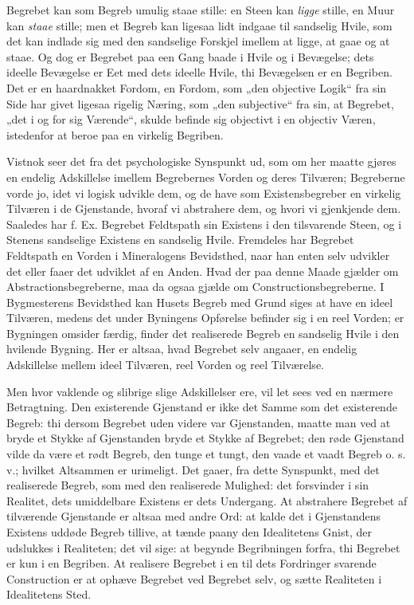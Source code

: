 \documentclass[11pt]{book}
\newcommand{\opage}[1]{\marginnote{\footnotesize\textit{[#1]}}}
\begin{document}
Begrebet kan som Begreb umulig staae stille: en Steen kan
\emph{ligge} stille, en Muur kan \emph{staae} stille; men et Begreb
kan ligesaa lidt indgaae til sandselig Hvile, som det kan indlade sig
med den sandselige Forskjel imellem at ligge, at gaae og at staae. Og
dog er Begrebet paa een Gang baade i Hvile og i Bevægelse; dets
ideelle Bevægelse er Eet med dets ideelle Hvile, thi Bevægelsen er en
Begriben. Det er en haardnakket Fordom, en Fordom, som „den objective
Logik“ fra sin Side har givet ligesaa rigelig Næring, som „den
subjective“ fra sin, at Begrebet, „det i og for sig Værende“, skulde
befinde sig objectivt i en objectiv Væren, istedenfor at beroe paa en
virkelig Begriben.

Vistnok seer det fra det psychologiske Synspunkt ud, som om her maatte
gjøres en endelig Adskillelse imellem Begrebernes Vorden og deres
Tilværen; Begreberne vorde jo, idet vi logisk udvikle dem, og de have
som Existensbegreber en virkelig Tilværen i de Gjenstande, hvoraf vi
abstrahere dem, og hvori vi gjenkjende dem. Saaledes har f. Ex.
Begrebet Feldtspath
\opage{168} \setcounter{footnote}{0}%
sin Existens i den tilsvarende Steen, og i Stenens sandselige Existens
en sandselig Hvile. Fremdeles har Begrebet Feldtspath en Vorden i
Mineralogens Bevidsthed, naar han enten selv udvikler det eller faaer
det udviklet af en Anden. Hvad der paa denne Maade gjælder om
Abstractionsbegreberne, maa da ogsaa gjælde om
Constructionsbegreberne. I Bygmesterens Bevidsthed kan Husets Begreb
med Grund siges at have en ideel Tilværen, medens det under Byningens
Opførelse befinder sig i en reel Vorden; er Bygningen omsider færdig,
finder det realiserede Begreb en sandselig Hvile i den hvilende
Bygning. Her er altsaa, hvad Begrebet selv angaaer, en endelig
Adskillelse mellem ideel Tilværen, reel Vorden og reel Tilværelse.

Men hvor vaklende og slibrige slige Adskillelser ere, vil let sees ved
en nærmere Betragtning. Den existerende Gjenstand er ikke det Samme
som det existerende Begreb: thi dersom Begrebet uden videre var
Gjenstanden, maatte man ved at bryde et Stykke af Gjenstanden bryde et
Stykke af Begrebet; den røde Gjenstand vilde da være et rødt Begreb,
den tunge et tungt, den vaade et vaadt Begreb o. s. v.; hvilket
Altsammen er urimeligt. Det gaaer, fra dette Synspunkt, med det
realiserede Begreb, som med den realiserede Mulighed: det forsvinder i
sin Realitet, dets umiddelbare Existens er dets Undergang. At
abstrahere Begrebet af tilværende Gjenstande er altsaa med andre Ord:
at kalde det i Gjenstandens Existens uddøde Begreb tillive, at tænde
paany den Idealitetens Gnist, der udslukkes i Realiteten; det vil
sige: at begynde Begribningen forfra, thi Begrebet er kun i en
Begriben. At realisere Begrebet i en til dets Fordringer svarende
Construction er at ophæve Begrebet ved Begrebet selv, og sætte
Realiteten i Idealitetens Sted.
\end{document}
